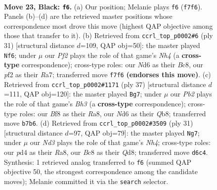 \documentclass[11pt]{article}
\begin{document}
\clearpage

\begin{figure}[p]\centering
\begin{subfigure}{0.46\textwidth}\centering
\resizebox{\linewidth}{!}{%
\newchessgame
\chessboard[
  setfen={2bqrb1k/rp1p1p1p/p2np3/7Q/P1PP2B1/2N2N2/1P3P1P/R1B2RK1 b - - 1 23},
  showmover=false,
  pgfstyle=straightmove, color=movearrow, markmove={f7-f6}
]}
\caption{}
\end{subfigure}\hfill
\begin{subfigure}{0.46\textwidth}\centering
\resizebox{\linewidth}{!}{%
\newchessgame
\chessboard[
  setfen={2bq1rk1/r3bppp/pp2p3/4N2n/PnBP4/2N4Q/1P3PPP/R1BR2K1 b - - 5 16},
  showmover=false,
  pgfstyle=straightmove, color=movearrow, markmove={h5-f6}
]}
\caption{}
\end{subfigure}
\\[4pt]
\begin{subfigure}{0.46\textwidth}\centering
\resizebox{\linewidth}{!}{%
\newchessgame
\chessboard[
  setfen={rqb2rk1/1p1n1p1p/p3p1pb/8/3BQ3/2PB1NP1/PP3P1P/R4RK1 b - - 1 19},
  showmover=false,
  pgfstyle=straightmove, color=movearrow, markmove={h6-g7}
]}
\caption{}
\end{subfigure}\hfill
\begin{subfigure}{0.46\textwidth}\centering
\resizebox{\linewidth}{!}{%
\newchessgame
\chessboard[
  setfen={r2qr1k1/pb1pbp1p/1pn3p1/2p1P2n/2Q5/2N2NP1/PP3PBP/R1BR2K1 b - - 4 16},
  showmover=false,
  pgfstyle=straightmove, color=movearrow, markmove={h5-g7}
]}
\caption{}
\end{subfigure}
\caption{\textbf{Move 23, Black: \texttt{f6}.} (a) Our position; Melanie plays \texttt{f6} (\texttt{f7f6}). Panels (b)--(d) are the retrieved master positions whose correspondence most drove this move (highest QAP objective among those that transfer to it). (b) Retrieved from \texttt{ccrl\_top\_p0002\#6} (ply 31) [structural distance $d$=109, QAP obj=50]: the master played \texttt{Nf6}; under $\mu$ our \emph{Pf2} plays the role of that game's \emph{Nh4} (a \textbf{cross-type} correspondence); cross-type roles: our \emph{N}d6 as their \emph{B}c8, our \emph{p}f2 as their \emph{R}a7; transferred move \texttt{f7f6} \textbf{(endorses this move)}. (c) Retrieved from \texttt{ccrl\_top\_p0002\#1171} (ply 37) [structural distance $d$=111, QAP obj=120]: the master played \texttt{Bg7}; under $\mu$ our \emph{Pb2} plays the role of that game's \emph{Bh3} (a \textbf{cross-type} correspondence); cross-type roles: our \emph{B}f8 as their \emph{R}a8, our \emph{N}d6 as their \emph{Q}b8; transferred move \texttt{b7b6}. (d) Retrieved from \texttt{ccrl\_top\_p0002\#3509} (ply 31) [structural distance $d$=97, QAP obj=79]: the master played \texttt{Ng7}; under $\mu$ our \emph{Nd3} plays the role of that game's \emph{Nh4}; cross-type roles: our \emph{p}d4 as their \emph{R}a8, our \emph{B}c8 as their \emph{Q}d8; transferred move \texttt{d6c4}. Synthesis: 1 retrieved analog transferred to \texttt{f6} (summed QAP objective 50, the strongest correspondence among the candidate moves); Melanie committed it via the \texttt{search} selector.}
\label{fig:thought-m45}
\end{figure}
\end{document}
